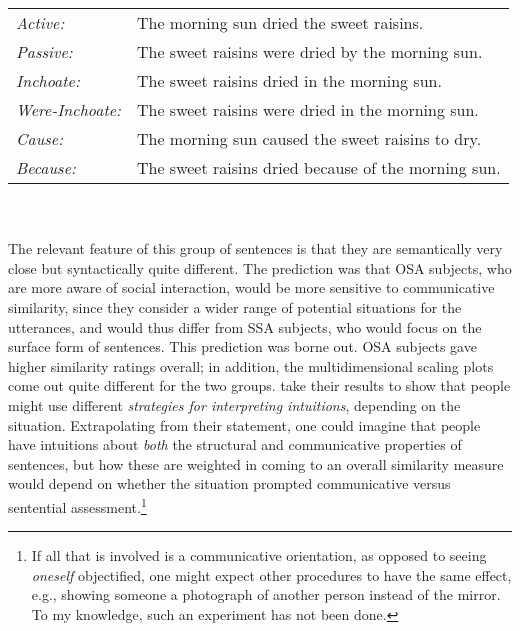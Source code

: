 \begin{tabular}{ll}
\textit{Active:}         &  The morning sun dried the sweet raisins.            \\
\textit{Passive:}        &  The sweet raisins were dried by the morning sun.      \\
\textit{Inchoate:}       &  The sweet raisins dried in the morning sun.            \\
\textit{Were-Inchoate:}  &  The sweet raisins were dried in the morning sun.        \\
\textit{Cause:}          &  The morning sun caused the sweet raisins to dry.          \\
\textit{Because:}        &  The sweet raisins dried because of the morning sun. \\
\end{tabular}\\\\
\noindent
The relevant feature of this group of sentences is that they are semantically very close but syntactically quite different. The prediction was that OSA subjects, who are more aware of social interaction, would be more sensitive to communicative similarity, since they consider a wider range of potential situations for the utterances, and would thus differ from SSA subjects, who would focus on the surface form of sentences. This prediction was borne out. OSA subjects gave higher similarity ratings overall; in addition, the multidimensional scaling plots come out quite different for the two groups. \citeauthor{CarrollEtAl1981} take their results to show that people might use different \textit{strategies for interpreting intuitions}, depending on the situation. Extrapolating from their statement, one could imagine that people have intuitions about \textit{both} the structural and communicative properties of sentences, but how these are weighted in coming to an overall similarity measure would depend on whether the situation prompted communicative versus sentential assessment.\footnote{If all that is involved is a communicative orientation, as opposed to seeing \textit{oneself} objectified, one might expect other procedures to have the same effect, e.g., showing someone a photograph of another person instead of the mirror. To my knowledge, such an experiment has not been done.}


